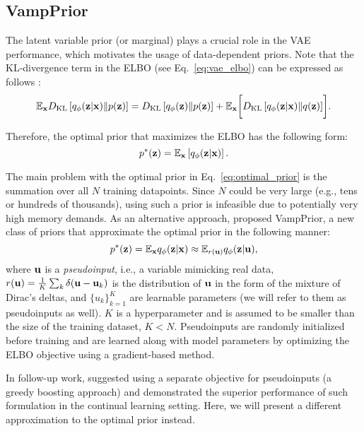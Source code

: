 \subsection{VampPrior}
The latent variable prior (or marginal) plays a crucial role in the VAE performance, which motivates the usage of data-dependent priors. 
Note that the KL-divergence term in the ELBO (see Eq.~\ref{eq:vae_elbo}) can be expressed as follows \citep{hoffman2016elbo}:
\begin{equation}
    \mathbb{E}_{{\mathbf{x}}} D_{\mathrm{KL}}\left[q_{\phi}({\mathbf{z}}|{\mathbf{x}})\|p({\mathbf{z}})\right] = D_{\mathrm{KL}}\left[q_{\phi}({\mathbf{z}})\| p({\mathbf{z}})\right] + \mathbb{E}_{{\mathbf{x}}} \biggl[ D_{\mathrm{KL}}\left[q_{\phi}({\mathbf{z}}|{\mathbf{x}})\|q({\mathbf{z}})\right] \biggr] .
\end{equation}

Therefore, the optimal prior that maximizes the ELBO has the following form:
\begin{equation}\label{eq:optimal_prior}
    p^*(\rvz) = \mathbb{E}_{\rvx} \left[ q_{\phi}(\rvz|\rvx) \right].
\end{equation}

The main problem with the optimal prior in Eq.~\ref{eq:optimal_prior} is the summation over all $N$ training datapoints. Since $N$ could be very large (e.g., tens or hundreds of thousands), using such a prior is infeasible due to potentially very high memory demands. As an alternative approach, \citet{tomczak2018vae} proposed VampPrior, a new class of priors that approximate the optimal prior in the following manner:
\begin{equation} \label{eq:vamp_prior_approx}
    p^*(\rvz) = \mathbb{E}_{\rvx} q_{\phi}(\rvz|\rvx) \approx \mathbb{E}_{r(\rvu)} q_{\phi}(\rvz|\rvu),
\end{equation}
where ${\mathbf{u}}$ is a \textit{pseudoinput}, i.e., a variable mimicking real data, $r({\mathbf{u}}) =\frac{1}{K}\sum_k \delta({\mathbf{u}} - {\mathbf{u}}_k)$ is the distribution of ${\mathbf{u}}$ in the form of the mixture of Dirac's deltas, and $\{u_k\}_{k=1}^K$ are learnable parameters (we will refer to them as pseudoinputs as well). $K$ is a hyperparameter and is assumed to be smaller than the size of the training dataset, $K < N$. Pseudoinputs are randomly initialized before training and are learned along with model parameters by optimizing the ELBO objective using a gradient-based method. 

In follow-up work, \citet{egorov2021boovae} suggested using a separate objective for pseudoinputs (a greedy boosting approach) and demonstrated the superior performance of such formulation in the continual learning setting. Here, we will present a different approximation to the optimal prior instead.

